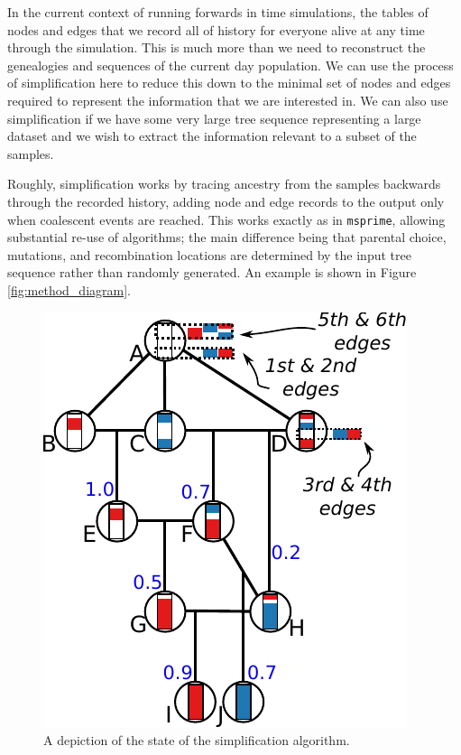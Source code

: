 \documentclass{article}
\newcommand{\msprime}{\texttt{msprime}}
\begin{document}
In the current context of running forwards in time simulations, the tables of
nodes and edges that we record all of history for everyone alive at any time through the simulation.
This is much more than we need to reconstruct the genealogies and sequences
of the current day population. We can use the process of simplification here to
reduce this down to the minimal set of nodes and edges required to represent
the information that we are interested in. We can also use simplification if  we have some very
large tree sequence representing a large dataset and we wish to extract the
information relevant to a subset of the samples.

Roughly, simplification works by tracing ancestry from the samples backwards
through the recorded history, adding node and edge records to the output
only when coalescent events are reached. This works exactly as in \msprime,
allowing substantial re-use of algorithms; the main difference being that
parental choice, mutations, and recombination locations are determined by the
input tree sequence rather than randomly generated. An example is shown in
Figure \ref{fig:method_diagram}.

\begin{figure}
    \begin{center}
        \includegraphics{simplify-state-diagram}
    \end{center}
    \caption{
        A depiction of the state of the simplification algorithm.
        \label{fig:simplify_state}
    }
\end{figure}
\end{document}
